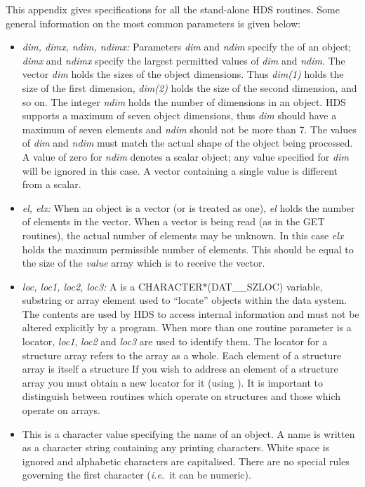 \documentclass[twoside,11pt]{starlink}
\providecommand{\qt}[1]{``#1''}
\providecommand{\st}[1]{{\emph{#1}}}
\providecommand{\astar}[0]{{$*$}}
\begin{document}
This appendix gives specifications for all the stand-alone HDS
routines.  Some general information on the most common parameters is
given below:

\begin{itemize}

\item \st{dim, dimx, ndim, ndimx:}
Parameters \st{dim} and \st{ndim} specify the  of an object;
\st{dimx} and \st{ndimx} specify the largest permitted values of
\st{dim} and \st{ndim}. The vector \st{dim} holds the sizes of the
object dimensions. Thus \st{dim(1)} holds the size of the first
dimension, \st{dim(2)} holds the size of the second dimension, and so
on. The integer \st{ndim} holds the number of dimensions in an
object. HDS supports a maximum of seven object dimensions, thus
\st{dim} should have a maximum of seven elements and \st{ndim} should
not be more than 7. The values of \st{dim} and \st{ndim} must match
the actual shape of the object being processed. A value of zero for
\st{ndim} denotes a scalar object; any value specified for \st{dim}
will be ignored in this case. A vector containing a single value is
different from a scalar.

\item \st{el, elx:}
When an object is a vector (or is treated as one), \st{el} holds the
number of elements in the vector. When a vector is being read (as in
the GET routines), the actual number of elements may be unknown. In
this case \st{elx} holds the maximum permissible number of
elements. This should be equal to the size of the \st{value} array
which is to receive the vector.

\item \st{loc, loc1, loc2, loc3:}
A  is a CHARACTER{\astar}(DAT\_\_SZLOC)
variable, substring or array element used to \qt{locate} objects
within the data system. The contents are used by HDS to access
internal information and must not be altered explicitly by a program.
When more than one routine parameter is a locator, \st{loc1},
\st{loc2} and \st{loc3} are used to identify them. The locator for a
structure array refers to the array as a whole. Each element of a
structure array is itself a structure If you wish to address an
element of a structure array you must obtain a new locator for it
(using ). It is important to distinguish
between routines which operate on structures and those which operate
on arrays.

\item \htmlref{\st{name:}}{sect:name}
This is a character value specifying the name of an object. A name is
written as a character string containing any printing
characters. White space is ignored and alphabetic characters are
capitalised. There are no special rules governing the first character
(\st{i.e.}\ it can be numeric).


\end{itemize}
\end{document}
